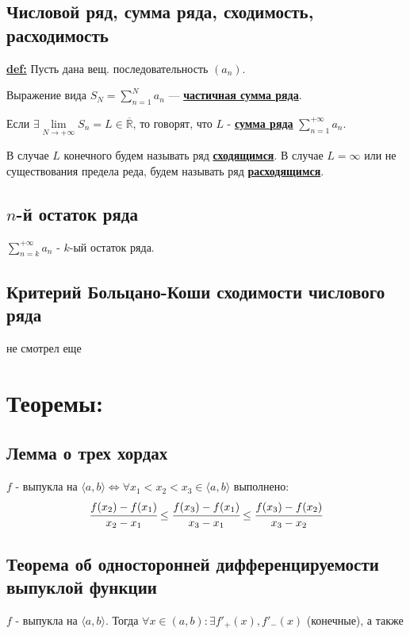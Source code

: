 \documentclass{article}
\newcommand{\deff}[1]{\underline{\textbf{#1}}}
\begin{document}
\subsection{Числовой ряд, сумма ряда, сходимость, расходимость}

\deff{def:} Пусть дана вещ. последовательность $(a_n)$. 

Выражение вида $S_N  = \sum\limits_{n=1}^N a_n$ --- \deff{частичная сумма ряда}.

Если $\exists \lim\limits_{N \rightarrow +\infty}S_n = L \in \overline{\mathbb{R}}$, то говорят, что $L$ - \deff{сумма ряда} $\sum\limits_{n=1}^{+\infty}a_n$.

В случае $L$ конечного будем называть ряд \deff{сходящимся}. В случае $L = \infty$ или не существования предела реда, будем называть ряд \deff{расходящимся}.  

\subsection{$n$-й остаток ряда}

$\sum\limits_{n=k}^{+\infty} a_n$ - $k$-ый остаток ряда.

\subsection{Критерий Больцано-Коши сходимости числового ряда}

не смотрел еще

\newpage 

\section{Теоремы:}

\subsection{Лемма о трех хордах}

$f$ - выпукла на $\langle a,b\rangle \Leftrightarrow \forall x_1<x_2<x_3 \in\langle a,b \rangle$ выполнено:
$$\cfrac{f(x_2)-f(x_1)}{x_2-x_1} \leq \cfrac{f(x_3)-f(x_1)}{x_3-x_1}\leq \cfrac{f(x_3)-f(x_2)}{x_3-x_2}$$

\subsection{Теорема об односторонней дифференцируемости выпуклой функции}

$f$ - выпукла на $\langle a,b \rangle$. Тогда $\forall x\in( a,b): \exists f'_+(x), f'_-(x)$ (конечные),  а также
\end{document}
